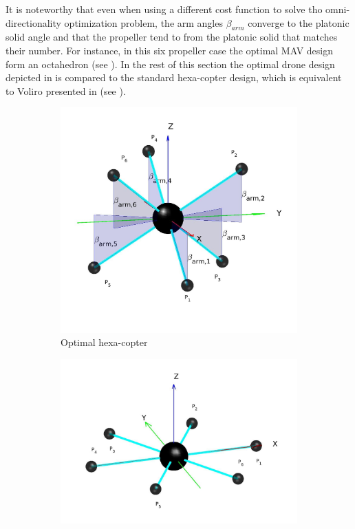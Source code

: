 It is noteworthy that even when using a different cost function to solve
tho omni-directionality optimization problem, the arm angles $\beta_{arm}$
converge to the platonic solid angle and that the propeller tend to from the
platonic solid that matches their number. For instance, in this six propeller case
the optimal MAV design form an octahedron (see ).
In the rest of this section the optimal drone design depicted in
 is compared to the standard hexa-copter design,
which is equivalent to Voliro presented in \citep{kamel_voliro:_2018}
(see ).

\begin{figure}[!ht]
  \begin{subfigure}[b]{0.45\textwidth}
    \centering
    \includegraphics[width=\linewidth]{images/Hexacopter.jpg}
    \caption{Optimal hexa-copter} \label{fig:Hexacopter_resulta}
  \end{subfigure}
  \hspace*{\fill} %
  \begin{subfigure}[b]{0.55\textwidth}
    \centering
    \includegraphics[width=\linewidth]{images/Voliro.jpg}

\end{subfigure}
\end{figure}
